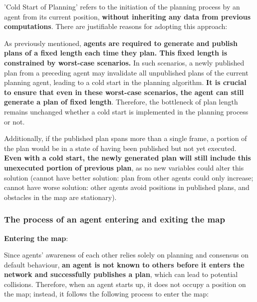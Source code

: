 'Cold Start of Planning' refers to the initiation of the planning process by an agent from its current position, \textbf{without inheriting any data from previous computations}. There are justifiable reasons for adopting this approach:

As previously mentioned, \textbf{agents are required to generate and publish plans of a fixed length each time they plan.
This fixed length is constrained by worst-case scenarios.} In such scenarios, a newly published plan from a preceding agent may invalidate all unpublished plans of the current planning agent, leading to a cold start in the planning algorithm.
\textbf{It is crucial to ensure that even in these worst-case scenarios, the agent can still generate a plan of fixed length}. Therefore, the bottleneck of plan length remains unchanged whether a cold start is implemented in the planning process or not.

Additionally, if the published plan spans more than a single frame, a portion of the plan would be in a state of having been published but not yet executed. \textbf{Even with a cold start, the newly generated plan will still include this unexecuted portion of previous plan}, as no new variables could alter this solution (cannot have better solution: plan from other agents could only increase; cannot have worse solution: other agents avoid positions in published plans, and obstacles in the map are stationary).


\subsubsection{The process of an agent entering and exiting the map}
\label{chap:join map}

\textbf{Entering the map}: 

Since agents' awareness of each other relies solely on planning and consensus on default behaviour, \textbf{an agent is not known to others before it enters the network and successfully publishes a plan}, which can lead to potential collisions. Therefore, when an agent starts up, it does not occupy a position on the map; instead, it follows the following process to enter the map:

